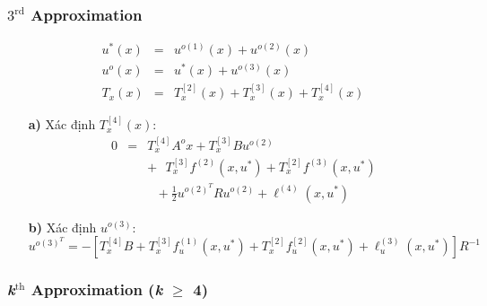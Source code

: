 \documentclass[12pt,a4paper]{report}
\begin{document}
\subsubsection{$3^{\text{rd}}$ Approximation}
\begin{eqnarray}
	u^*(x) &=& u^{o(1)}(x) + u^{o(2)}(x) \nonumber \\ u^o(x) &=&u^*(x) + u^{o(3)}(x) \nonumber \\ T_x(x) &=& T_x^{[2]}(x) + T_x^{[3]}(x) + T_x^{[4]}(x) \nonumber
\end{eqnarray}
\begin{itemize}
	\item[\textbf{a)}] Xác định $T_x^{[4]}(x)$: \begin{eqnarray}
		0 &=& T_x^{[4]}A^ox + T_x^{[3]}Bu^{o(2)} \nonumber \\ && + \text{ }T_x^{[3]}f^{(2)}(x, u^*) + T_x^{[2]}f^{(3)}(x, u^*) \nonumber \\ && \text{ } + \frac{1}{2}u^{o(2)^T}Ru^{o(2)} + \ell^{(4)}(x, u^*) \nonumber
	\end{eqnarray}
	\item[\textbf{b)}] Xác định $u^{o(3)}$: $$u^{o(3)^T} = -[T_x^{[4]}B + T_x^{[3]}f_u^{(1)}(x, u^*) + T_x^{[2]}f_u^{[2]}(x, u^*) + \ell_u^{(3)}(x, u^*)]R^{-1}$$
\end{itemize}
\subsubsection{\textit{k}$^{\text{th}}$ Approximation (\textit{k} $\geq$ 4)}
\end{document}
